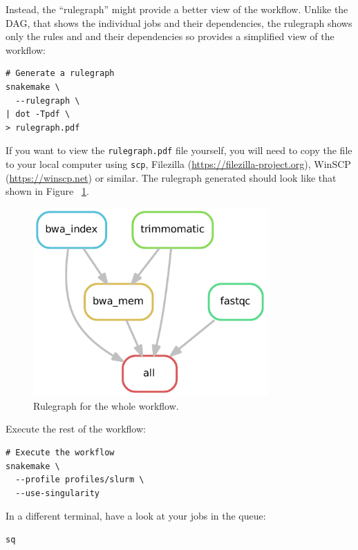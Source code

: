 Instead, the ``rulegraph'' might provide a better view of the workflow. Unlike the DAG, that shows the individual jobs and their
dependencies, the rulegraph shows only the rules and and their dependencies so provides a simplified view of the workflow:

\begin{lstlisting}
# Generate a rulegraph
snakemake \
  --rulegraph \
| dot -Tpdf \
> rulegraph.pdf
\end{lstlisting}

\begin{warning}

If you want to view the \texttt{rulegraph.pdf} file yourself, you will need to copy the file to your local computer using \texttt{scp},
Filezilla (\url{https://filezilla-project.org}), WinSCP (\url{https://winscp.net}) or similar. The rulegraph generated should look like
that shown in Figure ~\ref{fig:rulegraph}.

\end{warning}

\begin{figure}[H]
\centering
\includegraphics[width=0.8\textwidth]{handout/rulegraph.pdf}
\caption{Rulegraph for the whole workflow.}
\label{fig:rulegraph}
\end{figure}

Execute the rest of the workflow:

\begin{lstlisting}
# Execute the workflow
snakemake \
  --profile profiles/slurm \
  --use-singularity
\end{lstlisting}

In a different terminal, have a look at your jobs in the queue:

\begin{lstlisting}
sq
\end{lstlisting}

